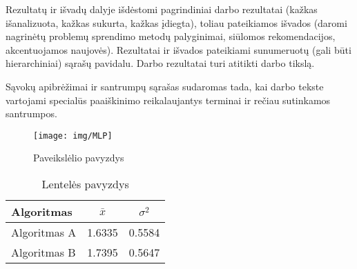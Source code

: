 \documentclass{VUMIFPSbakalaurinis}
\begin{document}
Rezultatų ir išvadų dalyje išdėstomi pagrindiniai darbo rezultatai (kažkas
išanalizuota, kažkas sukurta, kažkas įdiegta), toliau pateikiamos išvados
(daromi nagrinėtų problemų sprendimo metodų palyginimai, siūlomos
rekomendacijos, akcentuojamos naujovės). Rezultatai ir išvados pateikiami
sunumeruotų (gali būti hierarchiniai) sąrašų pavidalu. Darbo rezultatai turi
atitikti darbo tikslą.

\printbibliography[heading=bibintoc]  %

Sąvokų apibrėžimai ir santrumpų sąrašas sudaromas tada, kai darbo tekste
vartojami specialūs paaiškinimo reikalaujantys terminai ir rečiau sutinkamos
santrumpos.


\begin{figure}[H]
    \centering
    \texttt{[image: img/MLP]}
    \caption{Paveikslėlio pavyzdys}
    \label{img:mlp}
\end{figure}



\begin{table}[H]\footnotesize
  \centering
  \caption{Lentelės pavyzdys}
  {\begin{tabular}{|l|c|c|} \hline
    Algoritmas & $\bar{x}$ & $\sigma^{2}$ \\
    \hline
    Algoritmas A  & 1.6335    & 0.5584       \\
    Algoritmas B  & 1.7395    & 0.5647       \\
    \hline
  \end{tabular}}
  \label{tab:table example}
\end{table}
\end{document}
